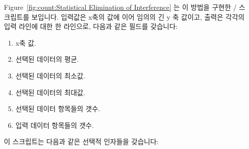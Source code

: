 Figure~\ref{fig:count:Statistical Elimination of Interference} 는 이 방법을
구현한 / 스크립트를 보입니다.
입력값은 x축의 값에 이어 임의의 긴 y 축 값이고, 출력은 각각의 입력 라인에 대한
한 라인으로, 다음과 같은 필드를 갖습니다:

\begin{enumerate}
\item	x축 값.
\item	선택된 데이터의 평균.
\item	선택된 데이터의 최소값.
\item	선택된 데이터의 최대값.
\item	선택된 데이터 항목들의 갯수.
\item	입력 데이터 항목들의 갯수.

\end{enumerate}

이 스크립트는 다음과 같은 선택적 인자들을 갖습니다:

